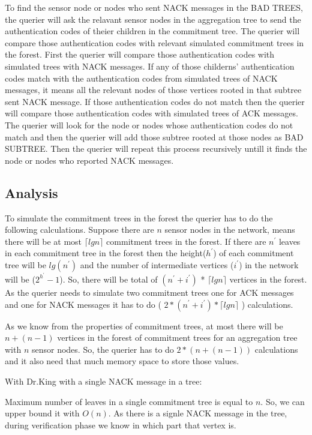 To find the sensor node or nodes who sent NACK messages in the BAD TREES, the querier will ask the relavant sensor nodes in the aggregation tree to send the authentication codes of theier children in the commitment tree. The querier will compare those authentication codes with relevant simulated commitment trees in the forest. First the querier will compare those authentication codes with simulated trees with NACK messages. If any of those childerns' authentication codes match with the authentication codes from simulated trees of NACK messages, it means all the relevant nodes of those vertices rooted in that subtree sent NACK message. If those authentication codes do not match then the querier will compare those authentication codes with simulated trees of ACK messages. The querier will look for the node or nodes whose authentication codes do not match and then the querier will add those subtree rooted at those nodes as BAD SUBTREE. Then the querier will repeat this process recursively untill it finds the node or nodes who reported NACK messages.

\subsection{Analysis} %
\label{sub:analysis}

To simulate the commitment trees in the forest the querier has to do the following calculations. Suppose there are $n$ sensor nodes in the network, means there will be at most $\lceil lg n \rceil$ commitment trees in the forest. If there are $n^{'}$ leaves in each commitment tree in the forest then the height($h^{'}$) of each commitment tree will be $lg(n^{'})$ and the number of intermediate vertices ($i^{'}$) in the network will be ($ 2^{h^{'}} - 1 $). So, there will be total of  $ (n^{'} + i^{'}) $ * $\lceil lg  n \rceil $  vertices in the forest. As the querier needs to simulate two commitment trees one for ACK messages and one for NACK messages it has to do ( $ 2 * (n^{'} + i^{'}) * \lceil lg  n \rceil $ ) calculations.

As we know from the properties of commitment trees, at most there 
will be $n + ( n - 1 )$ vertices in the forest of commitment trees 
for an aggregation tree with $n$ sensor nodes. So, the querier has
to do $ 2 * ( n + ( n - 1 ) )$ calculations and it also need that much memory space to store those values.

With Dr.King with a single NACK message in a tree:

Maximum number of leaves in a single commitment tree is equal to $n$. 
So, we can upper bound it with $O(n)$. As there is a signle NACK 
message in the tree, during verification phase we know in which part 
that vertex is. 

